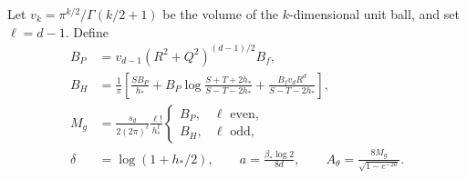 \documentclass[11pt,letterpaper]{article}
\theoremstyle{definition}
\theoremstyle{remark}
\begin{document}
Let \(v_k=\pi^{k/2}/\Gamma(k/2+1)\) be the volume of the \(k\)-dimensional unit
ball, and set \(\ell=d-1\). Define
\begin{align}
 B_P&=v_{d-1}(R^2+Q^2)^{(d-1)/2}B_f,\nonumber\\
 B_H&=\frac1\pi\left[
 \frac{S B_P}{h_*}
 +B_P\log\frac{S+T+2h_*}{S-T-2h_*}
 +\frac{B_fv_dR^d}{S-T-2h_*}\right],\label{eq:source-bounds}\\
 M_g&=\frac{s_d}{2(2\pi)^\ell}\frac{\ell!}{h_*^\ell}
       \begin{cases}B_P,&\ell\text{ even},\\ B_H,&\ell\text{ odd},\end{cases}\nonumber\\
 \delta&=\log(1+h_*/2),\qquad
 a=\frac{\beta_*\log2}{8d},\qquad
 A_\theta=\frac{8M_g}{\sqrt{1-e^{-2a}}}.\label{eq:source-norms}
\end{align}
\end{document}
